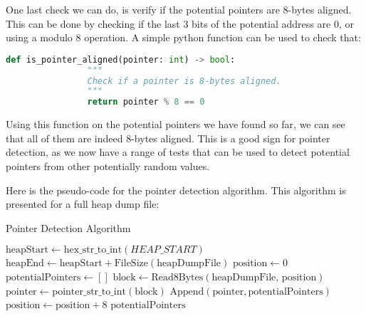     \begin{minipage}{\dimexpr\linewidth-20pt}
        One last check we can do, is verify if the potential pointers are  8-bytes aligned. This can be done by checking if the last 3 bits of the potential address are 0, or using a modulo 8 operation. A simple python function can be used to check that:

        \begin{lstlisting}[language=python, caption={Python function to check if a potential pointer is 8-bytes aligned}]
            def is_pointer_aligned(pointer: int) -> bool:
                """
                Check if a pointer is 8-bytes aligned.
                """
                return pointer % 8 == 0
        \end{lstlisting}
    \end{minipage}

    Using this function on the potential pointers we have found so far, we can see that all of them are indeed 8-bytes aligned. This is a good sign for pointer detection, as we now have a range of tests that can be used to detect potential pointers from other potentially random values.

    Here is the pseudo-code for the pointer detection algorithm. This algorithm is presented for a full heap dump file:

    \begin{algorithm}
        \caption{Pointer Detection Algorithm}
        \begin{algorithmic}[1]
            \State $\text{heapStart} \gets \text{hex\_str\_to\_int}(HEAP\_START)$
            \State $\text{heapEnd} \gets \text{heapStart} + \text{FileSize}(\text{heapDumpFile})$
            \State $\text{position} \gets 0$
            \State $\text{potentialPointers} \gets []$
                \State $\text{block} \gets \text{Read8Bytes}(\text{heapDumpFile, position})$
                    \State $\text{pointer} \gets \text{pointer\_str\_to\_int}(\text{block})$
                            \State $\text{Append}(\text{pointer}, \text{potentialPointers})$
                        \EndIf
                    \EndIf
                \EndIf
                \State $\text{position} \gets \text{position} + 8$
            \EndWhile
            \State \Return $\text{potentialPointers}$
        \EndProcedure
        \end{algorithmic}
    \end{algorithm}

